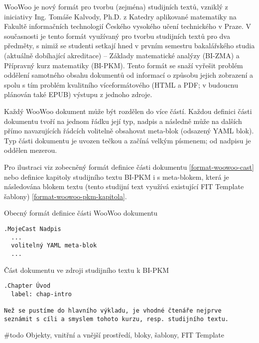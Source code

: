 WooWoo je nový formát pro tvorbu (zejména) studijních textů, vzniklý z iniciativy Ing. Tomáše Kalvody, Ph.D. z Katedry
aplikované matematiky na Fakultě informačních technologií Českého vysokého učení technického v Praze. V současnosti je
tento formát využívaný pro tvorbu studijních textů pro dva předměty, s nimiž se studenti setkají hned v prvním semestru
bakalářského studia (aktuálně dobíhající akreditace) – Základy matematické analýzy (BI-ZMA) a Přípravný kurz matematiky
(BI-PKM). Tento formát se snaží vyřešit problém oddělení samotného obsahu dokumentů od informací o způsobu jejich
zobrazení a spolu s tím problém kvalitního víceformátového (HTML a PDF; v budoucnu plánován také EPUB) výstupu z jednoho
zdroje.

Každý WooWoo dokument může být rozdělen do více částí. Každou definici části dokumentu tvoří na jednom řádku její typ,
nadpis a následně může na dalších přímo navazujících řádcích volitelně obsahovat meta-blok (odsazený YAML blok). Typ
části dokumentu je uvozen tečkou a začíná velkým písmenem; od nadpisu je oddělen mezerou.

Pro ilustraci viz zobecněný formát definice části dokumentu \ref{format-woowoo-cast} nebo definice kapitoly studijního
textu BI-PKM i s meta-blokem, která je následována blokem textu (tento studijní text využívá existující FIT Template
šablony) \ref{format-woowoo-pkm-kapitola}.

\begin{listing}
    \caption{Obecný formát definice části WooWoo dokumentu}
    \label{format-woowoo-cast}
    \begin{verbatim}
.MojeCast Nadpis
  ...
  volitelný YAML meta-blok
  ...
    \end{verbatim}
\end{listing}

\begin{listing}
    \caption{Část dokumentu ve zdroji studijního textu k BI-PKM \cite{pkm}}
    \label{format-woowoo-pkm-kapitola}
    \begin{verbatim}
.Chapter Úvod
  label: chap-intro

Než se pustíme do hlavního výkladu, je vhodné čtenáře nejprve
seznámit s cíli a smyslem tohoto kurzu, resp. studijního textu.
    \end{verbatim}
\end{listing}

\#todo Objekty, vnitřní a vnější prostředí, bloky, šablony, FIT Template
